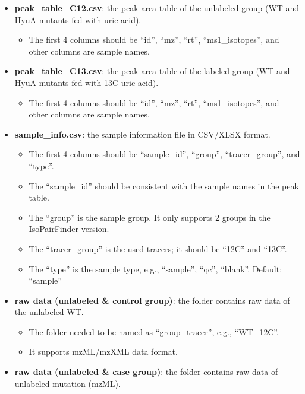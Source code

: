 \documentclass[
  letterpaper,
  DIV=11,
  numbers=noendperiod]{scrreprt}
\providecommand{\tightlist}{%
  \setlength{\itemsep}{0pt}\setlength{\parskip}{0pt}}
\begin{document}
\begin{itemize}
\tightlist
\item
  \textbf{peak\_table\_C12.csv}: the peak area table of the unlabeled
  group (WT and HyuA mutants fed with uric acid).

  \begin{itemize}
  \tightlist
  \item
    The first 4 columns should be ``id'', ``mz'', ``rt'',
    ``ms1\_isotopes'', and other columns are sample names.
  \end{itemize}
\item
  \textbf{peak\_table\_C13.csv}: the peak area table of the labeled
  group (WT and HyuA mutants fed with 13C-uric acid).

  \begin{itemize}
  \tightlist
  \item
    The first 4 columns should be ``id'', ``mz'', ``rt'',
    ``ms1\_isotopes'', and other columns are sample names.
  \end{itemize}
\item
  \textbf{sample\_info.csv}: the sample information file in CSV/XLSX
  format.

  \begin{itemize}
  \tightlist
  \item
    The first 4 columns should be ``sample\_id'', ``group'',
    ``tracer\_group'', and ``type''.
  \item
    The ``sample\_id'' should be consistent with the sample names in the
    peak table.
  \item
    The ``group'' is the sample group. It only supports 2 groups in the
    IsoPairFinder version.
  \item
    The ``tracer\_group'' is the used tracers; it should be ``12C'' and
    ``13C''.
  \item
    The ``type'' is the sample type, e.g., ``sample'', ``qc'',
    ``blank''. Default: ``sample''
  \end{itemize}
\item
  \textbf{raw data (unlabeled \& control group)}: the folder contains
  raw data of the unlabeled WT.

  \begin{itemize}
  \tightlist
  \item
    The folder needed to be named as ``group\_tracer'', e.g.,
    ``WT\_12C''.
  \item
    It supports mzML/mzXML data format.
  \end{itemize}
\item
  \textbf{raw data (unlabeled \& case group)}: the folder contains raw
  data of unlabeled mutation (mzML).


\end{itemize}
\end{document}
